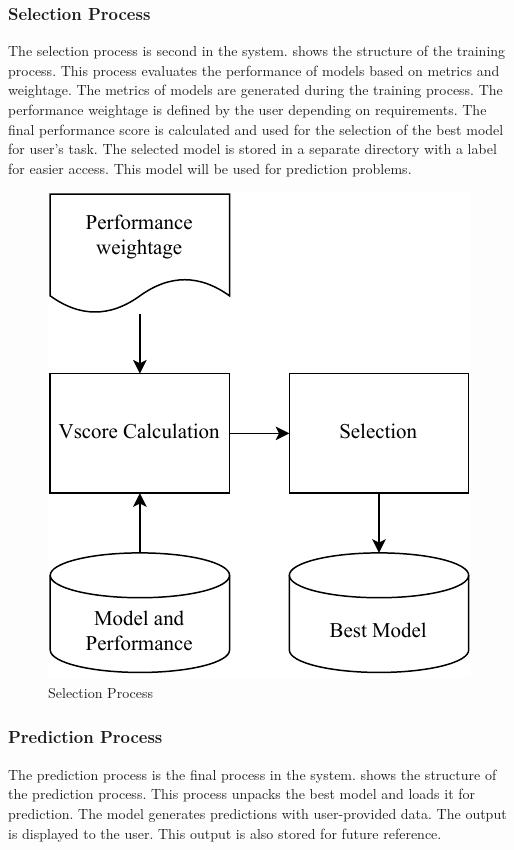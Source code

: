 \documentclass[a4paper,fleqn]{cas-dc}
\begin{document}
\subsubsection{Selection Process}\label{subsubsec:selection_process}

The selection process is second in the system.  shows the structure of the training process. This process evaluates the performance of models based on metrics and weightage. The metrics of models are generated during the training process. The performance weightage is defined by the user depending on requirements. The final performance score is calculated and used for the selection of the best model for user's task. The selected model is stored in a separate directory with a label for easier access. This model will be used for prediction problems.

\begin{figure}[ht]
    \centering
    \includegraphics[width=0.7\columnwidth]{selection.pdf}
    \caption{Selection Process}
    \label{fig:selection_process}
\end{figure}

\subsubsection{Prediction Process}\label{subsubsec:prediction_process}

The prediction process is the final process in the system.  shows the structure of the prediction process. This process unpacks the best model and loads it for prediction. The model generates predictions with user-provided data. The output is displayed to the user. This output is also stored for future reference.
\end{document}
